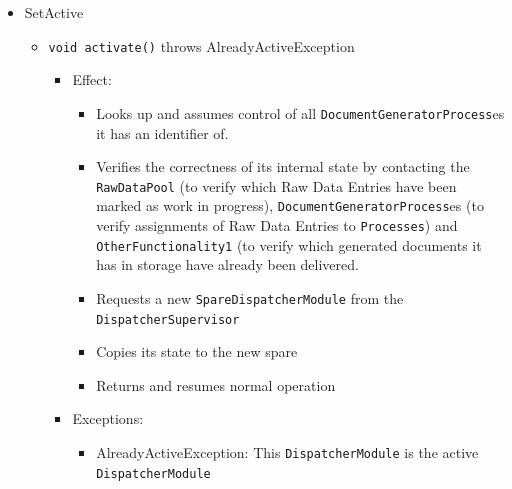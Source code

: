 \documentclass[a4paper,10pt]{article}
\begin{document}
\begin{itemize}
	\item SetActive
	\begin{itemize}
		\item \texttt{void activate()} throws AlreadyActiveException
		\begin{itemize}
			\item Effect:
			\begin{itemize}
				\item Looks up and assumes control of all \texttt{DocumentGeneratorProcess}es it has an identifier of.
				\item Verifies the correctness of its internal state by contacting the \texttt{RawDataPool} (to verify which Raw Data Entries have been marked as work in progress), \texttt{DocumentGeneratorProcess}es (to verify assignments of Raw Data Entries to \texttt{Processes}) and \texttt{OtherFunctionality1} (to verify which generated documents it has in storage have already been delivered.
				\item Requests a new \texttt{SpareDispatcherModule} from the \texttt{DispatcherSupervisor}
				\item Copies its state to the new spare
				\item Returns and resumes normal operation
			\end{itemize}
			\item Exceptions:
			\begin{itemize}
				\item AlreadyActiveException: This \texttt{DispatcherModule} is the active \texttt{DispatcherModule}
			\end{itemize}
		\end{itemize}
	\end{itemize}
\end{itemize}
\end{document}
